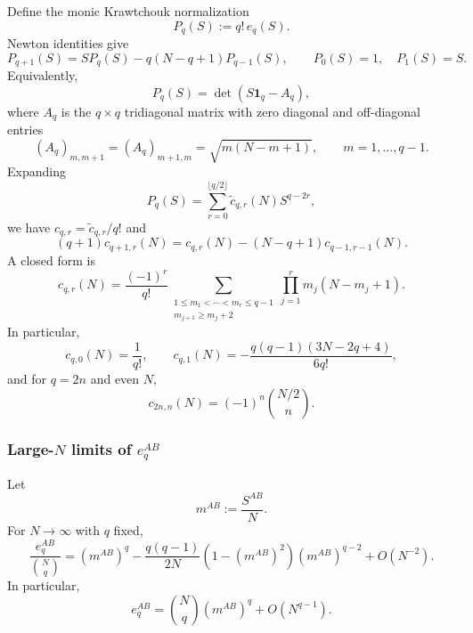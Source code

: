 \documentclass{article}
\theoremstyle{definition}
\begin{document}
Define the monic Krawtchouk normalization
\begin{equation}
    P_q(S):=q!\,e_q(S).
\end{equation}
Newton identities give
\begin{equation}
    P_{q+1}(S)
    =SP_q(S)-q(N-q+1)P_{q-1}(S),
    \qquad
    P_0(S)=1,\quad P_1(S)=S.
\end{equation}
Equivalently,
\begin{equation}
    P_q(S)=\det(S\mathbf 1_q-A_q),
\end{equation}
where $A_q$ is the $q\times q$ tridiagonal matrix with zero diagonal and
off-diagonal entries
\begin{equation}
    (A_q)_{m,m+1}=(A_q)_{m+1,m}
    =\sqrt{m(N-m+1)},
    \qquad m=1,\ldots,q-1.
\end{equation}
Expanding
\begin{equation}
    P_q(S)
    =\sum_{r=0}^{\lfloor q/2\rfloor}
    \widetilde c_{q,r}(N)S^{q-2r},
\end{equation}
we have $c_{q,r}=\widetilde c_{q,r}/q!$ and
\begin{equation}
    (q+1)c_{q+1,r}(N)
    =c_{q,r}(N)-(N-q+1)c_{q-1,r-1}(N).
\end{equation}
A closed form is
\begin{equation}
    c_{q,r}(N)
    =\frac{(-1)^r}{q!}
    \sum_{\substack{1\le m_1<\cdots<m_r\le q-1\\
                    m_{j+1}\ge m_j+2}}
    \prod_{j=1}^r m_j(N-m_j+1).
\end{equation}
In particular,
\begin{equation}
    c_{q,0}(N)=\frac1{q!},
    \qquad
    c_{q,1}(N)
    =-\frac{q(q-1)(3N-2q+4)}{6q!},
\end{equation}
and for $q=2n$ and even $N$,
\begin{equation}
    c_{2n,n}(N)=(-1)^n\binom{N/2}{n}.
\end{equation}

\subsubsection{Large-$N$ limits of $e_q^{AB}$}

Let
\begin{equation}
    m^{AB}:=\frac{S^{AB}}{N}.
\end{equation}
For $N\to\infty$ with $q$ fixed,
\begin{equation}
    \frac{e_q^{AB}}{\binom Nq}
    =(m^{AB})^q
     -\frac{q(q-1)}{2N}
      (1-(m^{AB})^2)(m^{AB})^{q-2}
     +O(N^{-2}).
\end{equation}
In particular,
\begin{equation}
    e_q^{AB}
    =\binom Nq(m^{AB})^q+O(N^{q-1}).
\end{equation}
\end{document}
